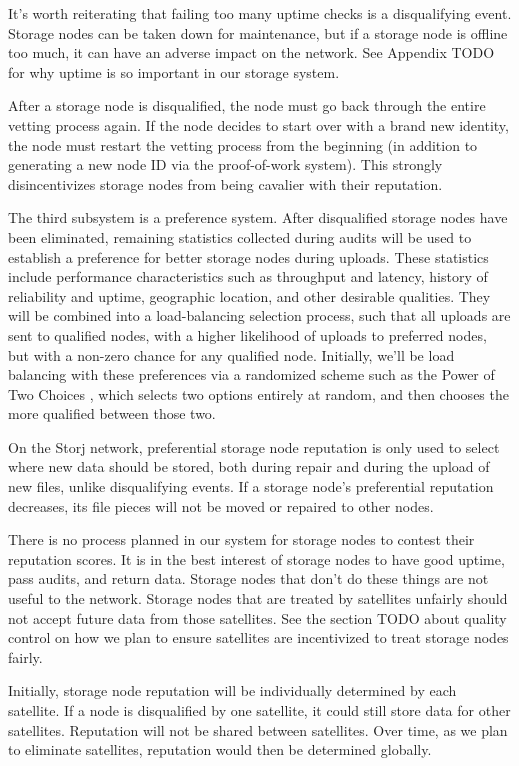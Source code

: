\documentclass[11pt,fleqn,openany]{book}
\newcommand{\todo}[1]{{\color{red} TODO #1 }}
\begin{document}
It's worth reiterating that failing too many uptime checks is a disqualifying
event. Storage nodes can be taken down for maintenance, but if a storage node
is offline too much, it can have an adverse impact on the network. See Appendix
\todo{} for why uptime is so important in our storage system.

After a storage node is disqualified, the node must go back through the entire
vetting process again. If the node decides to start over with a brand new
identity, the node must restart the vetting process from the beginning (in
addition to generating a new node ID via the proof-of-work system). This
strongly disincentivizes storage nodes from being cavalier with their
reputation.

The third subsystem is a preference system. After disqualified storage nodes
have been eliminated, remaining statistics collected during audits
will be used to establish a preference for better storage nodes during uploads.
These statistics include performance characteristics such as throughput and
latency, history of reliability and uptime, geographic location, and other
desirable qualities.
They will be combined into a load-balancing selection process, such
that all uploads are sent to qualified nodes, with a higher likelihood of
uploads to preferred nodes, but with a non-zero chance for any qualified node.
Initially, we'll be load balancing with these preferences via a randomized
scheme such as the Power of Two Choices \cite{power-of-two-choices}, which
selects two options entirely at random, and then chooses the more qualified
between those two.

On the Storj network, preferential storage node reputation is only used to
select where new data should be stored, both during repair and during the
upload of new files, unlike disqualifying events.
If a storage node's preferential reputation decreases, its file pieces will not
be moved or repaired to other nodes.

There is no process planned in our system for storage nodes to contest their
reputation scores. It is in the best interest of storage nodes to have good
uptime, pass audits, and return data. Storage nodes that don't do these things
are not useful to the network. Storage nodes that are treated by satellites
unfairly should not accept future data from those satellites. See the section
\todo{} about quality control on how we plan to ensure satellites are
incentivized to treat storage nodes fairly.

Initially, storage node reputation will be individually determined by each
satellite. If a node is disqualified by one satellite, it could still
store data for other satellites. Reputation will not be shared between
satellites. Over time, as we plan to eliminate satellites,
reputation would then be determined globally.
\end{document}
